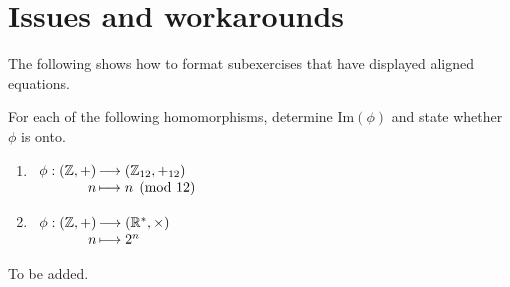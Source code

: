 \documentclass[solutionsatend,twocolumnsolutions]{ouunit}
\begin{document}
\section{Issues and workarounds}
The following shows how to format subexercises that have displayed aligned equations.
\begin{exercise}
For each of the following homomorphisms, determine \(\mathrm{Im}(\phi)\) and state whether \(\phi\) is onto.
\begin{enumerate}
\item \(\begin{array}[t]{r@{\,}l}
\phi:(\mathbb{Z},+)&\longrightarrow (\mathbb{Z}_{12},+_{12})\\
  n&\longmapsto n\pmod{12}
  \end{array}\)
\item \(\begin{array}[t]{r@{\,}l}
\phi:(\mathbb{Z},+)&\longrightarrow (\mathbb{R}^*,\times)\\
  n&\longmapsto 2^n
  \end{array}\)
\end{enumerate}
\begin{solution}
To be added.
\end{solution}
\end{exercise}
\end{document}
